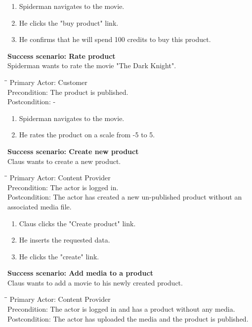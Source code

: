 \begin{enumerate} \setlength{\itemsep}{-1mm}
	\item Spiderman navigates to the movie.
	\item He clicks the "buy product" link.
	\item He confirms that he will spend 100 credits to buy this product.
\end{enumerate}
\vspace{3mm}
\textbf{Success scenario: Rate product} \\
Spiderman wants to rate the movie "The Dark Knight". 
\begin{tabbing}
\hspace{5mm}\=\hspace{26mm}\=\kill
\>Primary Actor:\> Customer\\
\>Precondition:\> The product is published.\\
\>Postcondition:\> -
\end{tabbing}
\begin{enumerate} \setlength{\itemsep}{-1mm}
	\item Spiderman navigates to the movie.
	\item He rates the product on a scale from -5 to 5.
\end{enumerate}
\vspace{3mm}
\textbf{Success scenario: Create new product} \\
Claus wants to create a new product. 
\begin{tabbing}
\hspace{5mm}\=\hspace{26mm}\=\kill
\>Primary Actor:\> Content Provider\\
\>Precondition:\> The actor is logged in.\\
\>Postcondition:\> The actor has created a new un-published product without an associated media file.
\end{tabbing}
\begin{enumerate} \setlength{\itemsep}{-1mm}
	\item Claus clicks the "Create product" link.
	\item He inserts the requested data.
	\item He clicks the "create" link.
\end{enumerate}
\vspace{3mm}
\textbf{Success scenario: Add media to a product} \\
Claus wants to add a movie to his newly created product.
\begin{tabbing}
\hspace{5mm}\=\hspace{26mm}\=\kill
\>Primary Actor:\> Content Provider\\
\>Precondition:\> The actor is logged in and has a product without any media.\\
\>Postcondition:\> The actor has uploaded the media and the product is published.
\end{tabbing}
